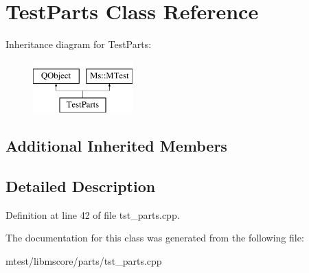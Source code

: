 \hypertarget{class_test_parts}{}\section{Test\+Parts Class Reference}
\label{class_test_parts}
Inheritance diagram for Test\+Parts\+:\begin{figure}[H]
\begin{center}
\leavevmode
\includegraphics[height=2.000000cm]{class_test_parts}
\end{center}
\end{figure}
\subsection*{Additional Inherited Members}


\subsection{Detailed Description}


Definition at line 42 of file tst\+\_\+parts.\+cpp.



The documentation for this class was generated from the following file\+:\begin{DoxyCompactItemize}
\item 
mtest/libmscore/parts/tst\+\_\+parts.\+cpp\end{DoxyCompactItemize}

